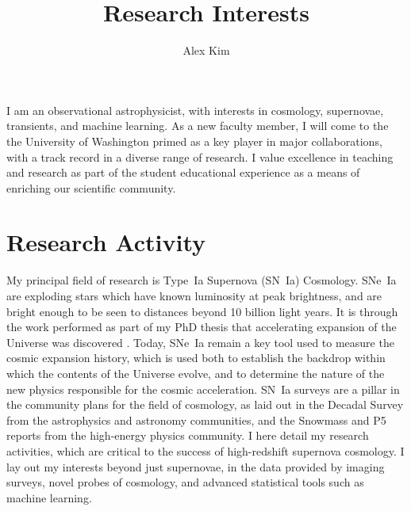 \documentclass{article}
\date{}
\newcommand{\where}{the University of Washington }
\newcommand{\where}{the University of Michigan }
\begin{document}
\title{Research Interests}
\author{Alex Kim}
\maketitle

I am an observational astrophysicist, with interests in
cosmology, supernovae, transients, and machine learning.
As a new faculty member, I will come to the \where
primed as a key player in major collaborations, with a
track record in a diverse range of research.  I  value excellence
in teaching and research as part of the student educational experience
as a means of enriching our scientific community.

\section{Research Activity}
My principal field of research is  Type~Ia Supernova (SN~Ia) Cosmology. 
SNe~Ia are exploding stars which have known luminosity at peak brightness, and are  bright enough to be
seen to distances beyond 10 billion light years.  It is through the work
performed as part of my PhD thesis that accelerating
expansion of the Universe was discovered \cite{1997ApJ...483..565P}.  Today, SNe~Ia remain a key tool used
to measure the cosmic expansion history, which is used both to establish
the  backdrop within which the contents of the Universe evolve,
and to determine the nature of the new physics responsible
for the cosmic acceleration.
SN~Ia surveys are a pillar  in the community plans for the field of cosmology,
as laid out in
the Decadal Survey from the astrophysics and astronomy communities, and the Snowmass
\cite{2013arXiv1309.5386D,2013arXiv1309.5382K} and P5 reports
from the high-energy physics community.  I here detail my research activities,
which are critical to the success of high-redshift supernova cosmology.
I lay out my interests beyond just supernovae, in the data provided by imaging surveys,
novel probes of cosmology, and advanced statistical tools such as machine learning.
\end{document}
